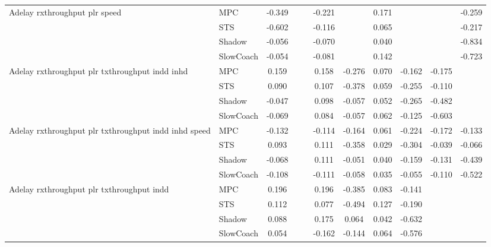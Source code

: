 \begin{tabular}{|l|l|*{9}{c|}}
\midrule
Adelay rxthroughput plr speed    & MPC &   -0.349 &        &        & -0.221 &     &  0.171 &      &      &   -0.259 \\
                              & STS &   -0.602 &        &        & -0.116 &     &  0.065 &      &      &   -0.217 \\
                              & Shadow &   -0.056 &        &        & -0.070 &     &  0.040 &      &      &   -0.834 \\
                              & SlowCoach &   -0.054 &        &        & -0.081 &     &  0.142 &      &      &   -0.723 \\
\midrule
Adelay rxthroughput plr txthroughput indd inhd    & MPC &    0.159 &        &        &  0.158 & -0.276 &  0.070 &  -0.162 &  -0.175 &       \\
                              & STS &    0.090 &        &        &  0.107 & -0.378 &  0.059 &  -0.255 &  -0.110 &       \\
                              & Shadow &   -0.047 &        &        &  0.098 & -0.057 &  0.052 &  -0.265 &  -0.482 &       \\
                              & SlowCoach &   -0.069 &        &        &  0.084 & -0.057 &  0.062 &  -0.125 &  -0.603 &       \\
\midrule
Adelay rxthroughput plr txthroughput indd inhd speed    & MPC &   -0.132 &        &        & -0.114 & -0.164 &  0.061 &  -0.224 &  -0.172 &   -0.133 \\
                              & STS &    0.093 &        &        &  0.111 & -0.358 &  0.029 &  -0.304 &  -0.039 &   -0.066 \\
                              & Shadow &   -0.068 &        &        &  0.111 & -0.051 &  0.040 &  -0.159 &  -0.131 &   -0.439 \\
                              & SlowCoach &   -0.108 &        &        & -0.111 & -0.058 &  0.035 &  -0.055 &  -0.110 &   -0.522 \\
\midrule
Adelay rxthroughput plr txthroughput indd    & MPC &    0.196 &        &        &  0.196 & -0.385 &  0.083 &  -0.141 &      &       \\
                              & STS &    0.112 &        &        &  0.077 & -0.494 &  0.127 &  -0.190 &      &       \\
                              & Shadow &    0.088 &        &        &  0.175 &  0.064 &  0.042 &  -0.632 &      &       \\
                              & SlowCoach &    0.054 &        &        & -0.162 & -0.144 &  0.064 &  -0.576 &      &       \\

\end{tabular}
